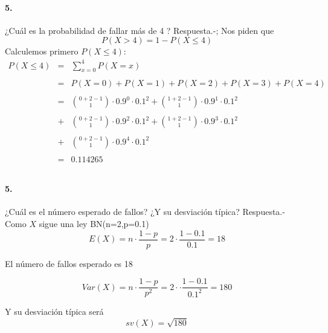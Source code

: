 \documentclass[
]{article}
\begin{document}
\hypertarget{section-3}{%
\paragraph{5.}\label{section-3}}

¿Cuál es la probabilidad de fallar más de 4 ? Respuesta.-; Nos piden que
\[P(X>4) = 1 - P(X\leq 4)\] Calculemos primero \(P(X\leq 4):\)
\[\begin{array}{rcl}
    P(X\leq 4)&=&\sum\limits_{x=0}^4 P(X=x)\\\\
    &=&P(X=0) + P(X=1) + P(X=2) + P(X=3) + P(X=4)\\\\
    &=&{0+2-1\choose 1}\cdot 0.9^0 \cdot 0.1^2 + {1+2-1 \choose 1}\cdot 0.9^1 \cdot 0.1^2\\\\
    &+&{0+2-1\choose 1}\cdot 0.9^2 \cdot 0.1^2 + {1+2-1 \choose 1}\cdot 0.9^3 \cdot 0.1^2\\\\
    &+&{0+2-1\choose 1}\cdot 0.9^4 \cdot 0.1^2 \\\\
    &=&0.114265\\\\
  \end{array}\]

\hypertarget{section-4}{%
\paragraph{5.}\label{section-4}}

¿Cuál es el número esperado de fallos? ¿Y su desviación típica?
Respuesta.- Como \(X\) sigue una ley BN(n=2,p=0.1)
\[E(X) = n\cdot \dfrac{1-p}{p} = 2 \cdot \dfrac{1-0.1}{0.1} = 18\]

El número de fallos esperado es 18

\[Var(X) = n\cdot \dfrac{1-p}{p^2} = 2\cdot \cdot \dfrac{1-0.1}{0.1^2} = 180\]

Y su desviación típica será \[sv(X) = \sqrt{180}\]
\end{document}
